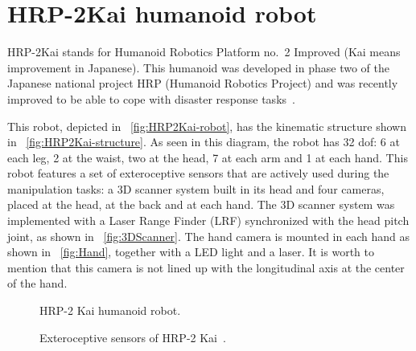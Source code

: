 \section{HRP-2Kai humanoid robot}
	\label{sec:hrp2kai}
	
	HRP-2Kai stands for Humanoid Robotics Platform no.~2 Improved (Kai means improvement in Japanese).
	This humanoid was developed in phase two of the Japanese national project HRP
	(Humanoid Robotics Project) and was recently improved to be able to cope with disaster response
	tasks~\cite{Kaneko}.
	
	This robot, depicted in \figurename~\ref{fig:HRP2Kai-robot}, has the kinematic structure shown
	in \figurename~\ref{fig:HRP2Kai-structure}.
	As seen in this diagram, the robot has 32 dof:
	6 at each leg, 2 at the waist, two at the head, 7 at each arm and 1 at each hand.
	This robot features a set of exteroceptive sensors that are actively used during the manipulation
	tasks: a 3D scanner system built in its head and four cameras, placed at the head, at the back and
	at each hand.
	The 3D scanner system was implemented with a Laser Range Finder (LRF) synchronized with the head
	pitch joint, as shown in \figurename~\ref{fig:3DScanner}.
	The hand camera is mounted in each hand as shown in \figurename~\ref{fig:Hand}, together with a
	LED light and a laser.
	It is worth to mention that this camera is not lined up with the longitudinal axis at the center
	of the hand.
	
	\begin{figure}[t]
		\begin{center}
			\hspace{1cm}
		\end{center}
		\caption{HRP-2 Kai humanoid robot.}
		\label{fig:HRP2Kai}
	\end{figure}
	
	\begin{figure}[b]
		\begin{center}
			\hspace{0.25cm}
		\end{center}
		\caption{Exteroceptive sensors of HRP-2 Kai~\cite{Kaneko}.}
		\label{fig:HRP2Kai}
	\end{figure}